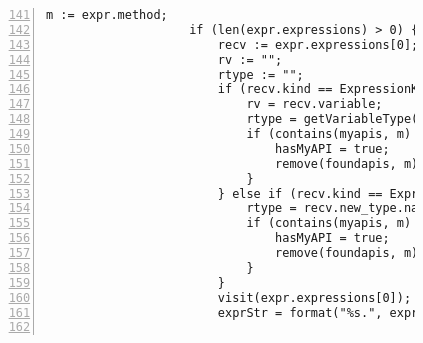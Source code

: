 \begin{figure}[ht!]
\begin{lstlisting}[numbers=left, tabsize=4, escapechar=@, caption={API Usage Mining Analysis},label={lst:aun-code},  firstline = 141, firstnumber = 141, lastline = 201]
                    m := expr.method;
                    if (len(expr.expressions) > 0) {
                        recv := expr.expressions[0];  
                        rv := ""; 
                        rtype := "";
                        if (recv.kind == ExpressionKind.VARACCESS) {
                            rv = recv.variable;
                            rtype = getVariableType(rv, true);
                            if (contains(myapis, m) && rtype != "") {
                                hasMyAPI = true;
                                remove(foundapis, m);
                            }
                        } else if (recv.kind == ExpressionKind.NEW) {
                            rtype = recv.new_type.name;
                            if (contains(myapis, m) && isAPIConstructor(recv.new_type.name)) {
                                hasMyAPI = true;    
                                remove(foundapis, m);
                            }
                        }
                        visit(expr.expressions[0]);
                        exprStr = format("%s.", exprStr);
                        

\end{lstlisting}
\end{figure}
